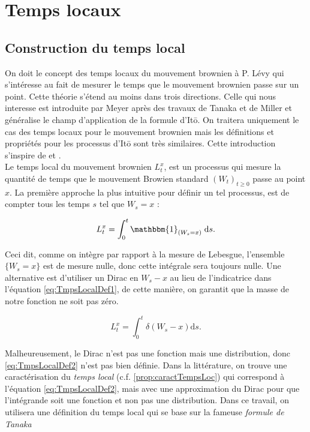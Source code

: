 \documentclass[openany]{book}
\newcommand{\1}{\mathbbm{1}}
\renewcommand{\d}{\mathrm{d}}
\theoremstyle{thmfont}
\theoremstyle{deffont}
\theoremstyle{thmfont}
\theoremstyle{deffont}
\begin{document}
\chapter{Temps locaux}

\section{Construction du temps local}\label{sec:ConstrTempsLoc}

On doit le concept des temps locaux du mouvement brownien à P. Lévy qui s’intéresse au fait de mesurer le temps que le mouvement brownien passe sur un point. Cette théorie s'étend au moins dans trois directions.
Celle qui nous interesse est introduite par Meyer après des travaux de Tanaka et de Miller et généralise le champ d'application de la formule d'Itō. On traitera uniquement le cas des temps locaux pour le mouvement brownien mais les définitions et propriétés pour les processus d'Itō sont très similaires. Cette introduction s'inspire de \cite{revuz-yor} et \cite{almostsure}.\\

Le temps local du mouvement brownien $L_t^x$, est un processus qui mesure la quantité de temps que le mouvement Browien standard $(W_t)_{t\geq0}$ passe au point $x$.
La première approche la plus intuitive pour définir un tel processus, est de compter tous les temps $s$ tel que $W_s = x$ :

\begin{equation}
  \label{eq:TmpsLocalDef1}
   L^x_t= \int_0^t\1_{(W_s=x)}\;\d s.
  \end{equation}

Ceci dit, comme on intègre par rapport à la mesure de Lebesgue, l'ensemble $\{W_s = x\}$ est de mesure nulle, donc cette intégrale sera toujours nulle. Une alternative est d'utiliser un Dirac en $W_s - x$ au lieu de l'indicatrice dans l'équation \eqref{eq:TmpsLocalDef1}, de cette manière, on garantit que la masse de notre fonction ne soit pas zéro.

\begin{equation}
  \label{eq:TmpsLocalDef2}
  L^x_t= \int_0^t\delta(W_s-x)\d s.
\end{equation}

Malheureusement, le Dirac n'est pas une fonction mais une distribution, donc \eqref{eq:TmpsLocalDef2} n'est pas bien définie. Dans la littérature, on trouve une caractérisation du \textit{temps local} (c.f. \autoref{prop:caractTempsLoc}) qui correspond à l'équation \eqref{eq:TmpsLocalDef2}, mais avec une approximation du Dirac pour que l'intégrande soit une fonction et non pas une distribution. Dans ce travail, on utilisera une définition du temps local qui se base sur la fameuse \textit{formule de Tanaka}\\
\end{document}
